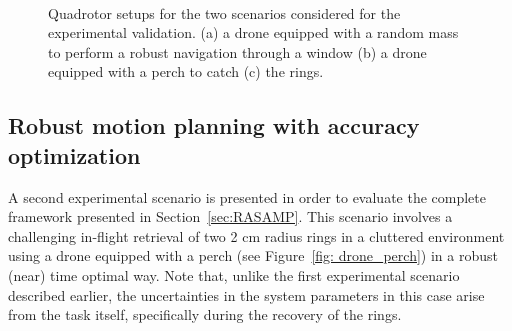 \begin{figure} [h!]
    \centering
    
     \\%
    \caption{Quadrotor setups for the two scenarios considered for the experimental validation. (a) a drone equipped with a random mass to perform a robust navigation through a window (b) a drone equipped with a perch to catch (c) the rings.}%
    \label{fig: exp setup}%
\end{figure}

\subsection{Robust motion planning with accuracy optimization} \label{sec:AccOptExp}

A second experimental scenario is presented in order to evaluate the complete framework presented in Section~\ref{sec:RASAMP}.
This scenario involves a challenging in-flight retrieval of two 2 cm radius rings in a cluttered environment using a drone equipped with a perch (see Figure~\ref{fig: drone_perch}) in a robust (near) time optimal way.
Note that, unlike the first experimental scenario described earlier, the uncertainties in the system parameters in this case arise from the task itself, specifically during the recovery of the rings.

